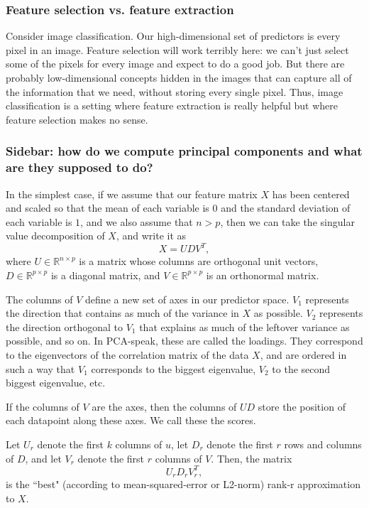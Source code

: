 \subsubsection{Feature selection vs. feature extraction}

Consider image classification. Our high-dimensional set of predictors is every pixel in an image. Feature selection will work terribly here: we can't just select some of the pixels for every image and expect to do a good job. But there are probably low-dimensional concepts hidden in the images that can capture all of the information that we need, without storing every single pixel. Thus, image classification is a setting where feature extraction is really helpful but where feature selection makes no sense.

\subsubsection{Sidebar: how do we compute principal components and what are they supposed to do?}

In the simplest case, if we assume that our feature matrix $X$ has been centered and scaled so that the mean of each variable is $0$ and the standard deviation of each variable is $1$, and we also assume that $n > p$, then we can take the singular value decomposition of $X$, and write it as 
$$
X = U D V^T, 
$$
where $U \in \mathbb{R}^{n \times p}$ is a matrix whose columns are orthogonal unit vectors, $D \in \mathbb{R}^{p \times p}$ is a diagonal matrix, and $V \in \mathbb{R}^{p \times p}$ is an orthonormal matrix. 

The columns of $V$ define a new set of axes in our predictor space. $V_1$ represents the direction that contains as much of the variance in $X$ as possible. $V_2$ represents the direction orthogonal to $V_1$ that explains as much of the leftover variance as possible, and so on. In PCA-speak, these are called the loadings. They correspond to the eigenvectors of the correlation matrix of the data $X$, and are ordered in such a way that $V_1$ corresponds to the biggest eigenvalue, $V_2$ to the second biggest eigenvalue, etc. 

If the columns of $V$ are the axes, then the columns of $U D$ store the position of each datapoint along these axes. We call these the scores. 

Let $U_{r}$ denote the first $k$ columns of $u$, let $D_r$ denote the first $r$ rows and columns of $D$, and let $V_r$ denote the first $r$ columns of $V$. Then, the matrix
$$
U_r D_r V_r^T, 
$$
is the ``best" (according to mean-squared-error or L2-norm) rank-r approximation to $X$. 

